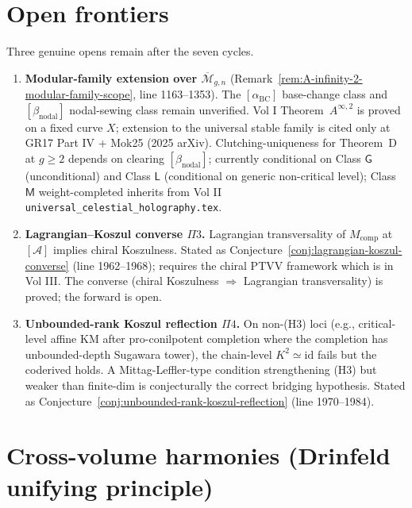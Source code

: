 \documentclass[11pt]{article}
\theoremstyle{definition}
\newcommand{\id}{\mathrm{id}}
\newcommand{\cA}{\mathcal{A}}
\begin{document}
\section*{Open frontiers}

Three genuine opens remain after the seven cycles.

\begin{enumerate}[label=\textbf{(O\arabic*)}]
\item \textbf{Modular-family extension over $\overline{\mathcal{M}}_{g,n}$}
(Remark~\ref{rem:A-infinity-2-modular-family-scope}, line 1163--1353).
The $[\alpha_{\mathrm{BC}}]$ base-change class and
$[\beta_{\mathrm{nodal}}]$ nodal-sewing class remain unverified.
Vol I Theorem~$A^{\infty,2}$ is proved on a fixed curve $X$;
extension to the universal stable family is cited only at
GR17 Part IV + Mok25 (2025 arXiv). Clutching-uniqueness for
Theorem~D at $g\geq 2$ depends on clearing $[\beta_{\mathrm{nodal}}]$;
currently conditional on Class $\mathsf{G}$ (unconditional) and
Class $\mathsf{L}$ (conditional on generic non-critical level);
Class $\mathsf{M}$ weight-completed inherits from Vol II
\texttt{universal\_celestial\_holography.tex}.
\item \textbf{Lagrangian--Koszul converse $\Pi 3$.} Lagrangian
transversality of $M_{\mathrm{comp}}$ at $[\cA]$ implies chiral
Koszulness. Stated as Conjecture~\ref{conj:lagrangian-koszul-converse}
(line 1962--1968); requires the chiral PTVV framework which is in
Vol III. The converse (chiral Koszulness $\Rightarrow$ Lagrangian
transversality) is proved; the forward is open.
\item \textbf{Unbounded-rank Koszul reflection $\Pi 4$.} On
non-(H3) loci (e.g., critical-level affine KM after pro-conilpotent
completion where the completion has unbounded-depth Sugawara
tower), the chain-level $K^{2}\simeq\id$ fails but the coderived
holds. A Mittag-Leffler-type condition strengthening (H3) but
weaker than finite-dim is conjecturally the correct bridging
hypothesis. Stated as Conjecture~\ref{conj:unbounded-rank-koszul-reflection}
(line 1970--1984).
\end{enumerate}

\section*{Cross-volume harmonies (Drinfeld unifying principle)}
\end{document}
